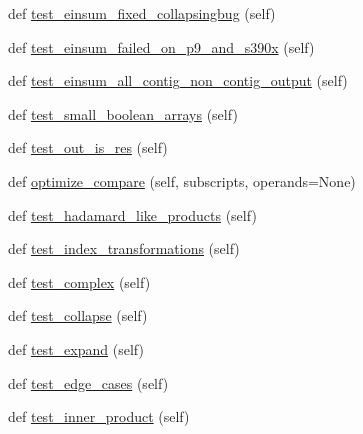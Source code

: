 \begin{DoxyCompactItemize}
def \hyperlink{classnumpy_1_1core_1_1tests_1_1test__einsum_1_1TestEinsum_a5126a863c108ce3ce0ecb642b6928ff2}{test\+\_\+einsum\+\_\+fixed\+\_\+collapsingbug} (self)
\item 
def \hyperlink{classnumpy_1_1core_1_1tests_1_1test__einsum_1_1TestEinsum_a293f399b76ceb9d271302c43f44bf455}{test\+\_\+einsum\+\_\+failed\+\_\+on\+\_\+p9\+\_\+and\+\_\+s390x} (self)
\item 
def \hyperlink{classnumpy_1_1core_1_1tests_1_1test__einsum_1_1TestEinsum_aa3589ab566f38349d82d761b26bfc64d}{test\+\_\+einsum\+\_\+all\+\_\+contig\+\_\+non\+\_\+contig\+\_\+output} (self)
\item 
def \hyperlink{classnumpy_1_1core_1_1tests_1_1test__einsum_1_1TestEinsum_a7b639b5364691f964d0172104cc7b9b1}{test\+\_\+small\+\_\+boolean\+\_\+arrays} (self)
\item 
def \hyperlink{classnumpy_1_1core_1_1tests_1_1test__einsum_1_1TestEinsum_a685ae7d6f680e2aa38f34a447e7ce6cd}{test\+\_\+out\+\_\+is\+\_\+res} (self)
\item 
def \hyperlink{classnumpy_1_1core_1_1tests_1_1test__einsum_1_1TestEinsum_ad2726e76355864980bd8b3473e11838d}{optimize\+\_\+compare} (self, subscripts, operands=None)
\item 
def \hyperlink{classnumpy_1_1core_1_1tests_1_1test__einsum_1_1TestEinsum_a9486e5b6ae18ecfbc849dc4e1763cc03}{test\+\_\+hadamard\+\_\+like\+\_\+products} (self)
\item 
def \hyperlink{classnumpy_1_1core_1_1tests_1_1test__einsum_1_1TestEinsum_a2a855cfd1a8e479c5bcf802d70d1078c}{test\+\_\+index\+\_\+transformations} (self)
\item 
def \hyperlink{classnumpy_1_1core_1_1tests_1_1test__einsum_1_1TestEinsum_a76d3cb4b1948eaf388a054bfbd9dddc8}{test\+\_\+complex} (self)
\item 
def \hyperlink{classnumpy_1_1core_1_1tests_1_1test__einsum_1_1TestEinsum_a6a15d57cea4cbf511c62735268e00f73}{test\+\_\+collapse} (self)
\item 
def \hyperlink{classnumpy_1_1core_1_1tests_1_1test__einsum_1_1TestEinsum_a050d55b204ae625531e751dd4aaa4756}{test\+\_\+expand} (self)
\item 
def \hyperlink{classnumpy_1_1core_1_1tests_1_1test__einsum_1_1TestEinsum_a9f068aec1df00e9ad9209e7682fe020e}{test\+\_\+edge\+\_\+cases} (self)
\item 
def \hyperlink{classnumpy_1_1core_1_1tests_1_1test__einsum_1_1TestEinsum_a505f49b970e3cf2d86477e685a9346e5}{test\+\_\+inner\+\_\+product} (self)
\item 

\end{DoxyCompactItemize}
